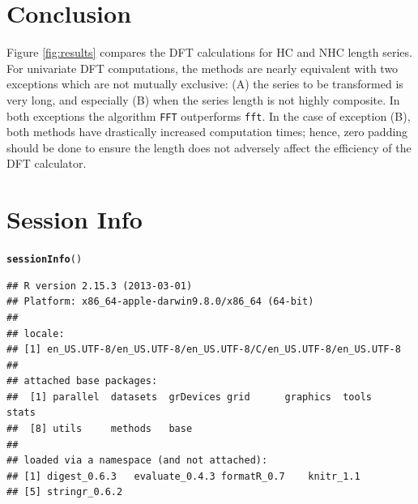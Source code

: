 \documentclass[12pt]{article}\usepackage{graphicx, color}
\makeatletter
\newcommand{\hlfunctioncall}[1]{\textcolor[rgb]{0.501960784313725,0,0.329411764705882}{\textbf{#1}}}%
\newenvironment{kframe}{%
 \def\at@end@of@kframe{}%
 \ifinner\ifhmode%
  \def\at@end@of@kframe{\end{minipage}}%
  \begin{minipage}{\columnwidth}%
 \fi\fi%
 \def\FrameCommand##1{\hskip\@totalleftmargin \hskip-\fboxsep
 \colorbox{shadecolor}{##1}\hskip-\fboxsep
     \hskip-\linewidth \hskip-\@totalleftmargin \hskip\columnwidth}%
 \MakeFramed {\advance\hsize-\width
   \@totalleftmargin\z@ \linewidth\hsize
   \@setminipage}}%
 {\par\unskip\endMakeFramed%
 \at@end@of@kframe}
\newenvironment{knitrout}{}{} %
\newcommand{\Rcmd}[1]{\texttt{#1}}
\makeatother
\begin{document}
\section{Conclusion}

Figure \ref{fig:results} compares the DFT
calculations for HC and NHC length series.
For univariate DFT computations,
the methods are nearly equivalent with two exceptions which
are not mutually exclusive: 
(A) the series to be transformed is very long, and 
especially (B) when the series length is not highly composite.
In both exceptions the algorithm \Rcmd{FFT} outperforms \Rcmd{fft}.
In the case of exception (B), both methods have
drastically increased computation times; hence, zero padding should be
done to ensure the length does not adversely
affect the efficiency of the DFT calculator.

\pagebreak

\section*{Session Info}
\begin{knitrout}
\color{fgcolor}\begin{kframe}
\begin{alltt}
\hlfunctioncall{sessionInfo}()
\end{alltt}
\begin{verbatim}
## R version 2.15.3 (2013-03-01)
## Platform: x86_64-apple-darwin9.8.0/x86_64 (64-bit)
## 
## locale:
## [1] en_US.UTF-8/en_US.UTF-8/en_US.UTF-8/C/en_US.UTF-8/en_US.UTF-8
## 
## attached base packages:
##  [1] parallel  datasets  grDevices grid      graphics  tools     stats    
##  [8] utils     methods   base     
## 
## loaded via a namespace (and not attached):
## [1] digest_0.6.3   evaluate_0.4.3 formatR_0.7    knitr_1.1     
## [5] stringr_0.6.2
\end{verbatim}
\end{kframe}
\end{knitrout}





\printindex
\end{document}
